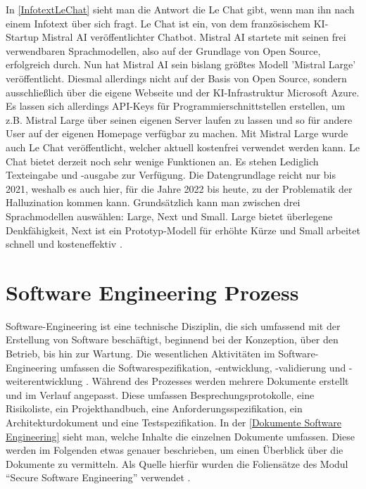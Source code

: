 In \autoref{InfotextLeChat} sieht man die Antwort die Le Chat gibt, wenn man ihn nach einem Infotext über sich 
fragt. Le Chat ist ein, von dem französischem KI-Startup Mistral AI veröffentlichter Chatbot. Mistral AI startete mit  
seinen frei verwendbaren Sprachmodellen, also auf der Grundlage von Open Source, erfolgreich durch. Nun  
hat Mistral AI sein bislang größtes Modell 'Mistral Large' veröffentlicht. Diesmal allerdings nicht auf der  
Basis von Open Source, sondern ausschließlich über die eigene Webseite und der KI-Infrastruktur Microsoft  
Azure. Es lassen sich allerdings API-Keys für Programmierschnittstellen erstellen, um z.B. Mistral Large über  
seinen eigenen Server laufen zu lassen und so für andere User auf der eigenen Homepage verfügbar zu machen.  
Mit Mistral Large wurde auch Le Chat veröffentlicht, welcher aktuell kostenfrei verwendet werden kann.
Le Chat bietet derzeit noch sehr wenige Funktionen an. Es stehen Lediglich Texteingabe und -ausgabe zur Verfügung.  
Die Datengrundlage reicht nur bis 2021, weshalb es auch hier, für die Jahre 2022 bis heute, zu der Problematik der  
Halluzination kommen kann.
Grundsätzlich kann man zwischen drei Sprachmodellen auswählen: Large, Next und Small. Large bietet überlegene Denkfähigkeit,  
Next ist ein Prototyp-Modell für erhöhte Kürze und Small arbeitet schnell und kosteneffektiv \cite{GrundlagenLeChat}.

\FloatBarrier

\section{Software Engineering Prozess}

Software-Engineering ist eine technische Disziplin, die sich umfassend mit der Erstellung von Software beschäftigt, 
beginnend bei der Konzeption, über den Betrieb, bis hin zur Wartung. Die wesentlichen Aktivitäten im 
Software-Engineering umfassen die Softwarespezifikation, -entwicklung, -validierung und -weiterentwicklung 
\cite{Sommerville10}. Während des Prozesses werden mehrere Dokumente erstellt und im Verlauf angepasst. 
Diese umfassen Besprechungsprotokolle, eine Risikoliste, ein Projekthandbuch, eine Anforderungsspezifikation, 
ein Architekturdokument und eine Testspezifikation. In der \autoref{Dokumente Software Engineering} sieht man, 
welche Inhalte die einzelnen Dokumente umfassen. Diese werden im Folgenden etwas genauer beschrieben, um einen 
Überblick über die Dokumente zu vermitteln. Als Quelle hierfür wurden die Foliensätze des Modul ``Secure Software Engineering''
verwendet \cite{BaumannSSE}.\\

